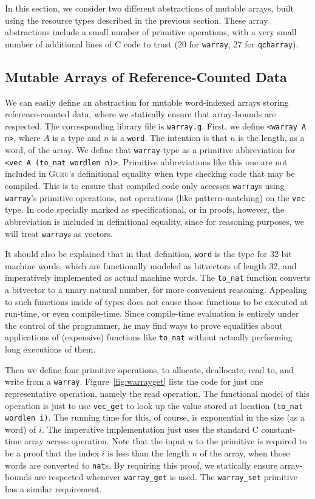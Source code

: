 \documentclass[9pt,natbib]{sigplanconf}
\begin{document}
In this section, we consider two different abstractions of mutable
arrays, built using the resource types described in the previous
section.  These array abstractions include a small number of primitive
operations, with a very small number of additional lines of C code to
trust (20 for \texttt{warray}, 27 for \texttt{qcharray}).  

\subsection{Mutable Arrays of Reference-Counted Data}
\label{sec:arrays}

We can easily define an abstraction for mutable word-indexed arrays
storing reference-counted data, where we statically ensure that
array-bounds are respected.  The corresponding library file is
\texttt{warray.g}.  First, we define \texttt{<warray A n>}, where $A$
is a type and $n$ is a \texttt{word}.  The intention is that $n$ is
the length, as a word, of the array.  We define that
\texttt{warray}-type as a primitive abbreviation for \texttt{<vec A
  (to\_nat wordlen n)>}.  Primitive abbreviations like this one are
not included in \textsc{Guru}'s definitional equality when type
checking code that may be compiled.  This is to ensure that compiled
code only accesses \texttt{warray}s using \texttt{warray}'s primitive
operations, not operations (like pattern-matching) on the \texttt{vec}
type.  In code specially marked as specificational, or in proofs,
however, the abbreviation is included in definitional equality, since
for reasoning purposes, we will treat \texttt{warray}s as vectors.

It should also be explained that in that definition, \texttt{word} is
the type for 32-bit machine words, which are functionally modeled as
bitvectors of length 32, and imperatively implemented as actual
machine words.  The \texttt{to\_nat} function converts a bitvector to
a unary natural number, for more convenient reasoning.  Appealing to
such functions inside of types does not cause those functions to be
executed at run-time, or even compile-time.  Since compile-time
evaluation is entirely under the control of the programmer, he may
find ways to prove equalities about applications of (expensive)
functions like \texttt{to\_nat} without actually performing long
executions of them.

Then we define four primitive operations, to allocate, deallocate,
read to, and write from a \texttt{warray}.  Figure~\ref{fig:warrayget}
lists the code for just one representative operation, namely the read
operation.  The functional model of this operation is just to use
\texttt{vec\_get} to look up the value stored at location
\texttt{(to\_nat wordlen i)}.  The running time for this, of course,
is exponential in the size (as a word) of $i$.  The imperative
implementation just uses the standard C constant-time array access
operation.  Note that the input $u$ to the primitive is required to be
a proof that the index $i$ is less than the length $n$ of the array,
when those words are converted to \texttt{nat}s.  By requiring this
proof, we statically ensure array-bounds are respected whenever
\texttt{warray\_get} is used.  The \texttt{warray\_set} primitive has
a similar requirement.  
\end{document}
